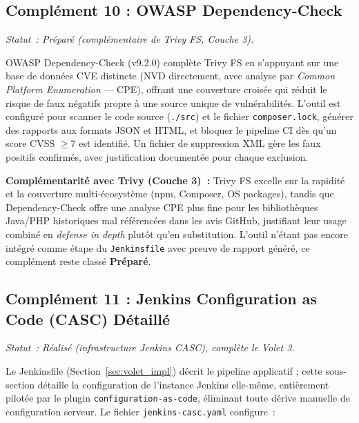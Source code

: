\subsection{Complément 10 : OWASP Dependency-Check}
\label{subsec:comp_owasp_depcheck}
\textit{Statut~: Préparé (complémentaire de Trivy FS, Couche 3).}

OWASP Dependency-Check (v9.2.0) complète Trivy FS en s'appuyant sur une base de données CVE distincte (NVD directement, avec analyse par \textit{Common Platform Enumeration} — CPE), offrant une couverture croisée qui réduit le risque de faux négatifs propre à une source unique de vulnérabilités. L'outil est configuré pour scanner le code source (\texttt{./src}) et le fichier \texttt{composer.lock}, générer des rapports aux formats JSON et HTML, et bloquer le pipeline CI dès qu'un score CVSS $\geq 7$ est identifié. Un fichier de suppression XML gère les faux positifs confirmés, avec justification documentée pour chaque exclusion.

\textbf{Complémentarité avec Trivy (Couche 3)~:} Trivy FS excelle sur la rapidité et la couverture multi-écosystème (npm, Composer, OS packages), tandis que Dependency-Check offre une analyse CPE plus fine pour les bibliothèques Java/PHP historiques mal référencées dans les avis GitHub, justifiant leur usage combiné en \textit{defense in depth} plutôt qu'en substitution. L'outil n'étant pas encore intégré comme étape du \texttt{Jenkinsfile} avec preuve de rapport généré, ce complément reste classé \textbf{Préparé}.


\subsection{Complément 11 : Jenkins Configuration as Code (CASC) Détaillé}
\label{subsec:comp_jenkins_casc}
\textit{Statut~: Réalisé (infrastructure Jenkins CASC), complète le Volet 3.}

Le Jenkinsfile (Section~\ref{sec:volet_impl}) décrit le pipeline applicatif ; cette sous-section détaille la configuration de l'instance Jenkins elle-même, entièrement pilotée par le plugin \texttt{configuration-as-code}, éliminant toute dérive manuelle de configuration serveur. Le fichier \texttt{jenkins-casc.yaml} configure~:

